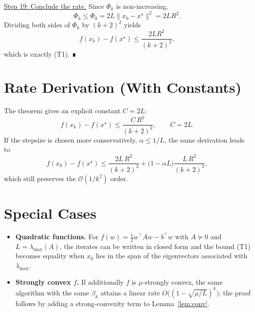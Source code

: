 \documentclass{article}
\begin{document}
\noindent\underline{Step 19: Conclude the rate.}  
Since $\Phi_{k}$ is non‑increasing,
\[
\Phi_{k}\le \Phi_{0}=2L\|x_{0}-x^{\star}\|^{2}=2LR^{2}.
\]
Dividing both sides of $\Phi_{k}$ by $(k+2)^{2}$ yields
\[
f(x_{k})-f(x^{\star})\le \frac{2LR^{2}}{(k+2)^{2}},
\]
which is exactly (T1). ∎

\section*{Rate Derivation (With Constants)}
The theorem gives an explicit constant $C=2L$:
\[
\boxed{ f(x_{k})-f(x^{\star})\le \frac{C\,R^{2}}{(k+2)^{2}},\qquad C=2L.}
\]
If the stepsize is chosen more conservatively, $\alpha\le 1/L$, the same derivation leads to
\[
f(x_{k})-f(x^{\star})\le \frac{2L\,R^{2}}{(k+2)^{2}}+\bigl(1-\alpha L\bigr) \frac{L\,R^{2}}{(k+2)^{2}},
\]
which still preserves the $\mathcal{O}(1/k^{2})$ order.

\section*{Special Cases}
\begin{itemize}
\item \textbf{Quadratic functions.} For $f(w)=\frac{1}{2}w^{\top}Aw-b^{\top}w$ with $A\succeq 0$ and $L=\lambda_{\max}(A)$, the iterates can be written in closed form and the bound (T1) becomes equality when $x_{0}$ lies in the span of the eigenvectors associated with $\lambda_{\max}$.
\item \textbf{Strongly convex $f$.} If additionally $f$ is $\mu$‑strongly convex, the same algorithm with the same $\beta_k$ attains a linear rate $O\!\bigl((1-\sqrt{\mu/L})^{k}\bigr)$; the proof follows by adding a strong‑convexity term to Lemma~\ref{lem:conv}.
\end{itemize}
\end{document}
